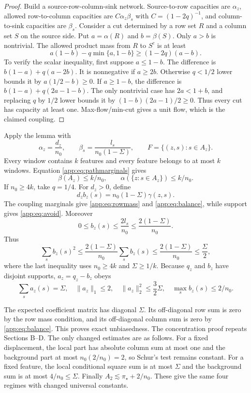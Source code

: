\begin{proof}
Build a source-row-column-sink network. Source-to-row capacities are $\alpha_z$, allowed row-to-column capacities are $C\alpha_z\beta_s$ with $C=(1-2q)^{-1}$, and column-to-sink capacities are $\beta_s$. Consider a cut determined by a row set $R$ and a column set $S$ on the source side. Put $a=\alpha(R)$ and $b=\beta(S)$. Only $a>b$ is nontrivial. The allowed product mass from $R$ to $S^c$ is at least
\begin{equation}
 a(1-b)-q\min\{a,1-b\}\ge(1-2q)(a-b).
 \label{app:eq:cutscalar}
\end{equation}
To verify the scalar inequality, first suppose $a\le1-b$. The difference is $b(1-a)+q(a-2b)$. It is nonnegative if $a\ge2b$. Otherwise $q<1/2$ lower bounds it by $a(1/2-b)\ge0$. If $a\ge1-b$, the difference is $b(1-a)+q(2a-1-b)$. The only nontrivial case has $2a<1+b$, and replacing $q$ by $1/2$ lower bounds it by $(1-b)(2a-1)/2\ge0$. Thus every cut has capacity at least one. Max-flow/min-cut gives a unit flow, which is the claimed coupling.
\end{proof}

Apply the lemma with
\[
 \alpha_z=\frac{d_z}{n_0},\qquad
 \beta_s=\frac{l_s}{n_0(1-\Sigma)},\qquad
 F=\{(z,s):s\in A_z\}.
\]
Every window contains $k$ features and every feature belongs to at most $k$ windows. Equation \eqref{app:eq:pathmarginals} gives
\[
 \beta(A_z)\le k/n_0,\qquad
 \alpha(\{z:s\in A_z\})\le k/n_0.
\]
If $n_0\ge4k$, take $q=1/4$. For $d_z>0$, define
\[
 d_zb_z(s)=n_0(1-\Sigma)\gamma(z,s).
\]
The coupling marginals give \eqref{app:eq:rowmass} and \eqref{app:eq:balance}, while support gives \eqref{app:eq:avoid}. Moreover
\begin{equation}
 0\le b_z(s)\le\frac{2l_s}{n_0}\le\frac{2(1-\Sigma)}{n_0}.
 \label{app:eq:bmax}
\end{equation}
Thus
\[
 \sum_sb_z(s)^2\le\frac{2(1-\Sigma)}{n_0}\sum_sb_z(s)
 \le\frac{2(1-\Sigma)}{n_0}\le\frac\Sigma2,
\]
where the last inequality uses $n_0\ge4k$ and $\Sigma\ge1/k$. Because $q_z$ and $b_z$ have disjoint supports, $a_z=q_z-b_z$ obeys
\[
 \sum_sa_z(s)=\Sigma,\quad \|a_z\|_1\le2,\quad
 \|a_z\|_2^2\le\frac32\Sigma,\quad
 \max_sb_z(s)\le2/n_0.
\]

The expected coefficient matrix has diagonal $\Sigma$. Its off-diagonal row sum is zero by the row mass condition, and its off-diagonal column sum is zero by \eqref{app:eq:balance}. This proves exact unbiasedness. The concentration proof repeats Sections B--D. The only changed estimates are as follows. For a fixed displacement, the local part has absolute column sum at most one and the background part at most $n_0(2/n_0)=2$, so Schur's test remains constant. For a fixed feature, the local conditional square sum is at most $\Sigma$ and the background sum is at most $4/n_0\le\Sigma$. Finally $A_2\lesssim\pi_\star+2/n_0$. These give the same four regimes with changed universal constants.

